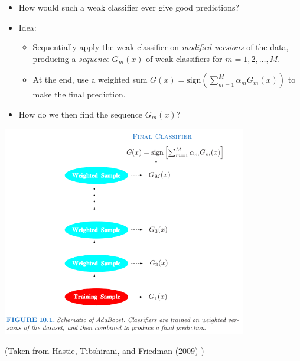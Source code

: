 \documentclass[
  10pt,
  ignorenonframetext,
]{beamer}
\providecommand{\tightlist}{%
  \setlength{\itemsep}{0pt}\setlength{\parskip}{0pt}}
\begin{document}
\begin{frame}
\vspace{2mm}

\begin{itemize}
\tightlist
\item
  How would such a weak classifier ever give good predictions?
\end{itemize}

\vspace{2mm}

\begin{itemize}
\tightlist
\item
  Idea:

  \begin{itemize}
  \tightlist
  \item
    Sequentially apply the weak classifier on \emph{modified versions}
    of the data, producing a \emph{sequence} \(G_m(x)\) of weak
    classifiers for \(m=1,2,\ldots,M\).
  \item
    At the end, use a weighted sum
    \(G(x)=\text{sign}\left( \sum_{m=1}^M \alpha_m G_m(x)\right)\) to
    make the final prediction.
  \end{itemize}
\end{itemize}

\vspace{2mm}

\begin{itemize}
\tightlist
\item
  How do we then find the sequence \(G_m(x)\)?
\end{itemize}
\end{frame}

\begin{frame}
\centering

\includegraphics[width=0.8\textwidth,height=\textheight]{fig10_1_elements.png}

\small

(Taken from Hastie, Tibshirani, and Friedman (2009) )
\end{frame}
\end{document}

